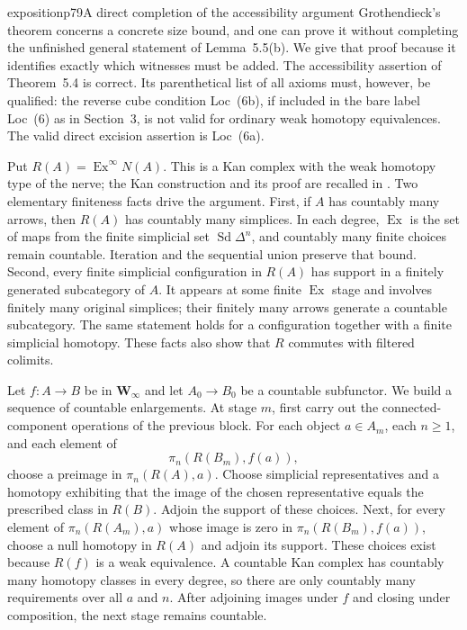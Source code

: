 \begin{dcomment}{exposition}{p79}{A direct completion of the accessibility argument}
Grothendieck's theorem concerns a concrete size bound, and one can prove it without completing the unfinished general statement of Lemma~5.5(b). We give that proof because it identifies exactly which witnesses must be added. The accessibility assertion of Theorem~5.4 is correct. Its parenthetical list of all axioms must, however, be qualified: the reverse cube condition Loc~(6b), if included in the bare label Loc~(6) as in Section~3, is not valid for ordinary weak homotopy equivalences. The valid direct excision assertion is Loc~(6a).

Put $R(A)=\operatorname{Ex}^{\infty}N(A)$. This is a Kan complex with the weak homotopy type of the nerve; the Kan construction and its proof are recalled in \citet[Proposition~2.1.39]{Cisinski2006}. Two elementary finiteness facts drive the argument. First, if $A$ has countably many arrows, then $R(A)$ has countably many simplices. In each degree, $\operatorname{Ex}$ is the set of maps from the finite simplicial set $\operatorname{Sd}\Delta^n$, and countably many finite choices remain countable. Iteration and the sequential union preserve that bound. Second, every finite simplicial configuration in $R(A)$ has support in a finitely generated subcategory of $A$. It appears at some finite $\operatorname{Ex}$ stage and involves finitely many original simplices; their finitely many arrows generate a countable subcategory. The same statement holds for a configuration together with a finite simplicial homotopy. These facts also show that $R$ commutes with filtered colimits.

Let $f:A\to B$ be in $\mathbf W_\infty$ and let $A_0\to B_0$ be a countable subfunctor. We build a sequence of countable enlargements. At stage $m$, first carry out the connected-component operations of the previous block. For each object $a\in A_m$, each $n\geq1$, and each element of
\[
 \pi_n(R(B_m),f(a)),
\]
choose a preimage in $\pi_n(R(A),a)$. Choose simplicial representatives and a homotopy exhibiting that the image of the chosen representative equals the prescribed class in $R(B)$. Adjoin the support of these choices. Next, for every element of $\pi_n(R(A_m),a)$ whose image is zero in $\pi_n(R(B_m),f(a))$, choose a null homotopy in $R(A)$ and adjoin its support. These choices exist because $R(f)$ is a weak equivalence. A countable Kan complex has countably many homotopy classes in every degree, so there are only countably many requirements over all $a$ and $n$. After adjoining images under $f$ and closing under composition, the next stage remains countable.


\end{dcomment}
